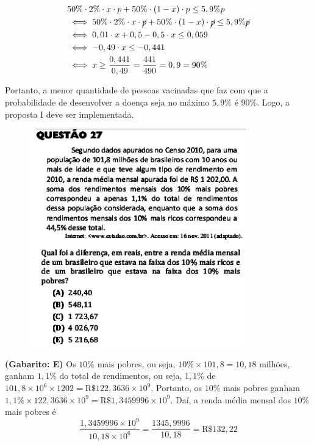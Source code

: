 \documentclass[a4paper]{article}
\begin{document}
\begin{align*}
&50\%\cdot 2\% \cdot x\cdot p + 50\%\cdot (1-x)\cdot p \leq 5,9\%p \\ 
&\iff 50\%\cdot 2\% \cdot x\cdot \cancel{p} + 50\%\cdot (1-x)\cdot \cancel{p} \leq 5,9\%\cancel{p} \\
&\iff  0,01\cdot x + 0,5 - 0,5\cdot x \leq 0,059 \\
&\iff -0,49\cdot x \leq -0,441 \\
&\iff x\geq\frac{0,441}{0,49} = \frac{441}{490} = 0,9 = 90\%
\end{align*}
\par\vspace{0.3cm} Portanto, a menor quantidade de pessoas vacinadas que faz com que a probabilidade de desenvolver a doença seja no máximo $5,9\%$ é $90\%$. Logo, a proposta I deve ser implementada.
\begin{figure}[H]
	\begin{center}
		\includegraphics[width=9.5cm]{L3Q27.png}
	\end{center}
\end{figure}
\par\textbf{(Gabarito: E)} Os $10\%$ mais pobres, ou seja, $10\%\times 101,8 = 10,18$ milhões, ganham $1,1\%$ do total de rendimentos, ou seja, $1,1\%$ de $101,8\times 10^6\times 1202 = \text{R\$}122,3636\times 10^9$. Portanto, os $10\%$ mais pobres ganham $1,1\%\times 122,3636\times 10^9 = \text{R\$}1,3459996\times 10^9$. Daí, a renda média mensal dos $10\%$ mais pobres é 
\begin{equation*}
\frac{1,3459996\times 10^9}{10,18\times 10^6} = \frac{1345,9996}{10,18} = \text{R\$}132,22
\end{equation*}
\end{document}
